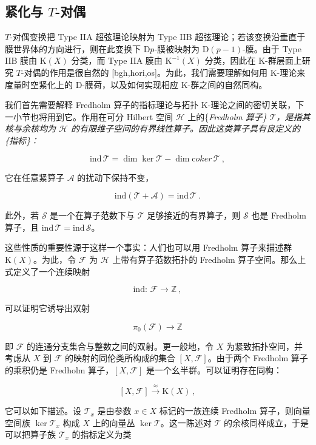 \documentclass[11pt,a4paper]{ctexart}
\newcommand{\SrcRange}[2]{\marginpar{\raggedright\footnotesize 原文 p.#1}}
\begin{document}
\SrcRange{96}{96}
\subsection{\texorpdfstring{紧化与 \(T\)-对偶}{紧化与 T-对偶}}\label{ux7d27ux5316ux4e0e-t-ux5bf9ux5076}

\(T\)-对偶变换把 Type IIA 超弦理论映射为 Type IIB 超弦理论；若该变换沿垂直于膜世界体的方向进行，则在此变换下 D\(p\)-膜被映射为 D\((p-1)\)-膜。由于 Type IIB 膜由 \({\mathrm K}(X)\) 分类，而 Type IIA 膜由 \({\mathrm K}^{-1}(X)\) 分类，因此在 K-群层面上研究 \(T\)-对偶的作用是很自然的 [bgh,hori,os]。为此，我们需要理解如何用 K-理论来度量时空紧化上的 D-膜荷，以及如何实现相应 K-群之间的自然同构。

我们首先需要解释 Fredholm 算子的指标理论与拓扑 K-理论之间的密切关联，下一小节也将用到它。作用在可分 Hilbert 空间 \({\mathcal H}\) 上的\{\it Fredholm 算子\} \({\mathcal T}\)，是指其核与余核均为 \(\mathcal H\) 的有限维子空间的有界线性算子。因此这类算子具有良定义的\{\it 指标\}：

\[\mathrm{ind}\,{\mathcal T}=\dim\ker{\mathcal T}-\dim{\mathrm coker}\,{\mathcal T}\ ,\]

它在任意紧算子 \({\mathcal A}\) 的扰动下保持不变，

\[\mathrm{ind}({\mathcal T}+{\mathcal A})=\mathrm{ind}\,{\mathcal T}\ .\]

此外，若 \({\mathcal S}\) 是一个在算子范数下与 \({\mathcal T}\) 足够接近的有界算子，则 \({\mathcal S}\) 也是 Fredholm 算子，且 \(\mathrm{ind}\,{\mathcal T}=\mathrm{ind}\,{\mathcal S}\)。

这些性质的重要性源于这样一个事实：人们也可以用 Fredholm 算子来描述群 \({\mathrm K}(X)\)。为此，令 \({\mathcal F}\) 为 \({\mathcal H}\) 上带有算子范数拓扑的 Fredholm 算子空间。那么上式定义了一个连续映射

\[\mathrm{ind}:\, {\mathcal F}\longrightarrow{\mathbb{Z}}\ ,\]

可以证明它诱导出双射

\[\pi_0({\mathcal F})\longrightarrow{\mathbb{Z}}\]

即 \({\mathcal F}\) 的连通分支集合与整数之间的双射。更一般地，令 \(X\) 为紧致拓扑空间，并考虑从 \(X\) 到 \({\mathcal F}\) 的映射的同伦类所构成的集合 \([X,{\mathcal F}]\)。由于两个 Fredholm 算子的乘积仍是 Fredholm 算子，\(\left[X,{\mathcal F}\right]\) 是一个幺半群。可以证明存在同构：

\[\left[X,{\mathcal F}\right]\stackrel{\approx}{\longrightarrow}{\mathrm K}(X)\ ,\]

它可以如下描述。设 \({\mathcal T}_x\) 是由参数 \(x\in X\) 标记的一族连续 Fredholm 算子，则向量空间族 \(\ker{\mathcal T}_x\) 构成 \(X\) 上的向量丛 \(\ker{\mathcal T}\)。这一陈述对 \({\mathcal T}\) 的余核同样成立，于是可以把算子族 \({\mathcal T}_x\) 的指标定义为类
\end{document}
